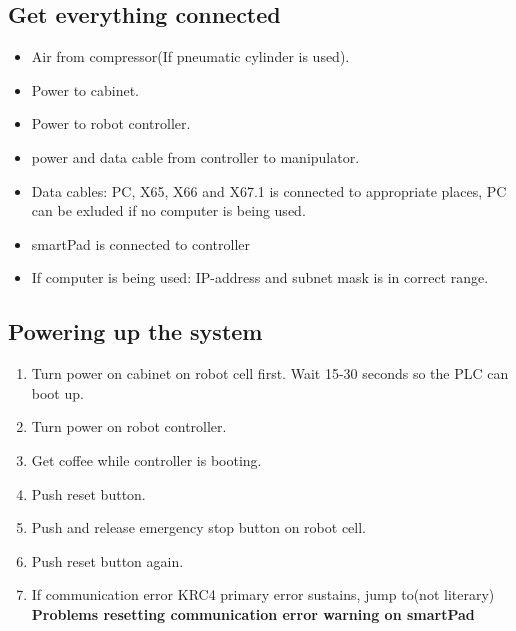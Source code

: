 \documentclass{article}
\begin{document}
    \subsection{Get everything connected}
    \begin{itemize}
        \item Air from compressor(If pneumatic cylinder is used).
        \item Power to cabinet.
        \item Power to robot controller.
        \item power and data cable from controller to manipulator.
        \item Data cables: PC, X65, X66 and X67.1 is connected to appropriate places, PC can be exluded if no computer is being used.
        \item smartPad is connected to controller
        \item If computer is being used: IP-address and subnet mask is in correct range.
    \end{itemize}
    
    \subsection{Powering up the system}
    \begin{enumerate}
        \item Turn power on cabinet on robot cell first. Wait 15-30 seconds so the PLC can boot up.
        \item Turn power on robot controller.
        \item Get coffee while controller is booting.
        \item Push reset button.
        \item Push and release emergency stop button on robot cell.
        \item Push reset button again.
        \item If communication error KRC4 primary error sustains, jump to(not literary) \textbf{Problems resetting communication error warning on smartPad} 
    \end{enumerate}
\end{document}
